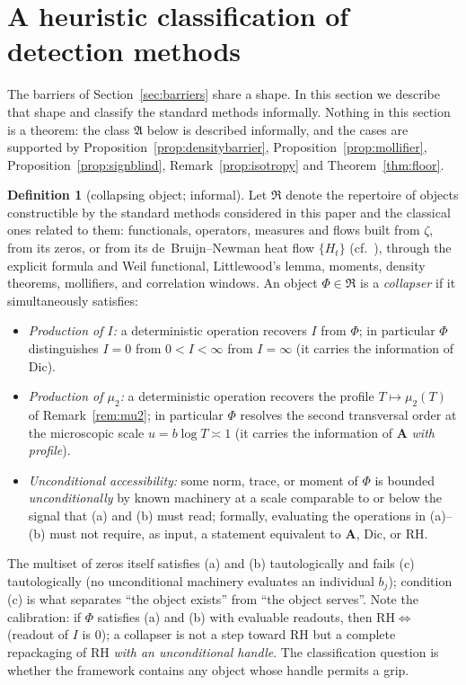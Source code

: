 \documentclass[11pt]{amsart}
\theoremstyle{plain}
\theoremstyle{definition}
\newtheorem{definition}[theorem]{Definition}
\theoremstyle{remark}
\newcommand{\RH}{\mathrm{RH}}
\newcommand{\Dic}{\mathrm{Dic}}
\newcommand{\Aax}{\mathbf{A}}
\begin{document}
\section{A heuristic classification of detection methods}\label{sec:trichotomy}

The barriers of Section~\ref{sec:barriers} share a shape. In this section we describe that shape and classify the standard methods informally. Nothing in this section is a theorem: the class $\mathfrak A$ below is described informally, and the cases are supported by Proposition~\ref{prop:densitybarrier}, Proposition~\ref{prop:mollifier}, Proposition~\ref{prop:signblind}, Remark~\ref{prop:isotropy} and Theorem~\ref{thm:floor}.

\begin{definition}[collapsing object; informal]\label{def:collapser}
Let $\mathfrak R$ denote the repertoire of objects constructible by the standard methods considered in this paper and the classical ones related to them: functionals, operators, measures and flows built from $\zeta$, from its zeros, or from its de~Bruijn--Newman heat flow $\{H_t\}$ (cf.\ \cite{deBruijn1950,KiKimLee2009,RodgersTao2020,Polymath2019}), through the explicit formula and Weil functional, Littlewood's lemma, moments, density theorems, mollifiers, and correlation windows. An object $\Phi\in\mathfrak R$ is a \emph{collapser} if it simultaneously satisfies:
\begin{itemize}
\item[\textup{(a)}] \emph{Production of $I$:} a deterministic operation recovers $I$ from $\Phi$; in particular $\Phi$ distinguishes $I=0$ from $0<I<\infty$ from $I=\infty$ (it carries the information of $\Dic$).
\item[\textup{(b)}] \emph{Production of $\mu_2$:} a deterministic operation recovers the profile $T\mapsto\mu_2(T)$ of Remark~\ref{rem:mu2}; in particular $\Phi$ resolves the second transversal order at the microscopic scale $u=b\log T\asymp1$ (it carries the information of $\Aax$ \emph{with profile}).
\item[\textup{(c)}] \emph{Unconditional accessibility:} some norm, trace, or moment of $\Phi$ is bounded \emph{unconditionally} by known machinery at a scale comparable to or below the signal that \textup{(a)} and \textup{(b)} must read; formally, evaluating the operations in \textup{(a)}--\textup{(b)} must not require, as input, a statement equivalent to $\Aax$, $\Dic$, or $\RH$.
\end{itemize}
The multiset of zeros itself satisfies (a) and (b) tautologically and fails (c) tautologically (no unconditional machinery evaluates an individual $b_j$); condition (c) is what separates ``the object exists'' from ``the object serves''. Note the calibration: if $\Phi$ satisfies (a) and (b) with evaluable readouts, then $\RH\iff$ (readout of $I$ is $0$); a collapser is not a step toward $\RH$ but a complete repackaging of $\RH$ \emph{with an unconditional handle}. The classification question is whether the framework contains any object whose handle permits a grip.
\end{definition}
\end{document}
